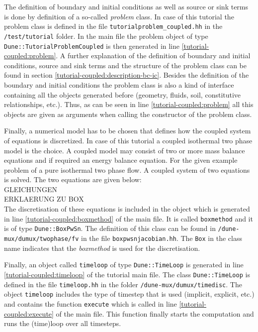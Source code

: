 The definition of boundary and initial conditions as well as source or sink terms is done by definition of a so-called \textit{problem} class. In case of this tutorial the problem class is defined in the file \texttt{tutorialproblem\_coupled.hh} in the \texttt{/test/tutorial} folder. In the main file the problem object of type \texttt{Dune::TutorialProblemCoupled} is then generated in line \ref{tutorial-coupled:problem}. A further explanation of the definition of boundary and initial conditions, source and sink terms and the structure of the problem class can be found in section \ref{tutorial-coupled:description-bc-ic}. Besides the definition of the boundary and initial conditions the problem class is also a kind of interface containing all the objects generated before (geometry, fluids, soil, constitutive relationships, etc.). Thus, as can be seen in line \ref{tutorial-coupled:problem} all this objects are given as arguments when calling the constructor of the problem class.     

Finally, a numerical model has to be chosen that defines how the coupled system of equations is discretized. In case of this tutorial a coupled isothermal two phase model is the choice. A coupled model may consist of two or more mass balance equations and if required an energy balance equation. For the given example problem of a pure isothermal two phase flow. A coupled system of two equations is solved. The two equations are given below:
\begin{equation}
\end{equation}
GLEICHUNGEN\\
ERKLAERUNG ZU BOX\\

The discretisation of these equations is included in the object which is generated in line \ref{tutorial-coupled:boxmethod} of the main file. It is called \texttt{boxmethod} and it is of type \texttt{Dune::BoxPwSn}. The definition of this class can be found in \texttt{/dune-mux/dumux/twophase/fv} in the file \texttt{boxpwsnjacobian.hh}. The \texttt{Box} in the class name indicates that the \textit{boxmethod} is used for the discretisation. 

Finally, an object called \texttt{timeloop} of type \texttt{Dune::TimeLoop} is generated in line \ref{tutorial-coupled:timeloop} of the tutorial main file. The class \texttt{Dune::TimeLoop} is defined in the file \texttt{timeloop.hh} in the folder \texttt{/dune-mux/dumux/timedisc}. The object \texttt{timeloop} includes the type of timestep that is used (implicit, explicit, etc.) and contains the function \texttt{execute} which is called in line \ref{tutorial-coupled:execute} of the main file. This function finally starts the computation and runs the (time)loop over all timesteps.

